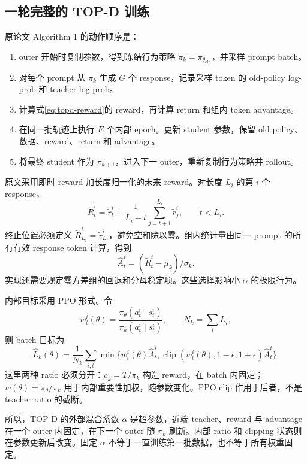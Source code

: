 \subsection{一轮完整的 TOP-D 训练}

原论文 Algorithm 1 的动作顺序是：
\begin{enumerate}
 \item outer 开始时复制参数，得到冻结行为策略 $\pi_k=\pi_{\theta_{\mathrm{old}}}$，并采样 prompt batch。
 \item 对每个 prompt 从 $\pi_k$ 生成 $G$ 个 response，记录采样 token 的 old-policy log-prob 和 teacher log-prob。
 \item 计算式\eqref{eq:topd-reward}的 reward，再计算 return 和组内 token advantage。
 \item 在同一批轨迹上执行 $E$ 个内部 epoch。更新 student 参数，保留 old policy、数据、reward、return 和 advantage。
 \item 将最终 student 作为 $\pi_{k+1}$，进入下一 outer，重新复制行为策略并 rollout。
\end{enumerate}

原文采用即时 reward 加长度归一化的未来 reward。对长度 $L_i$ 的第 $i$ 个 response，
\begin{equation}
 \widetilde R_t^i=\widetilde r_t^i+
 \frac{1}{L_i-t}\sum_{j=t+1}^{L_i}\widetilde r_j^i,\qquad t<L_i.
 \label{eq:topd-return}
\end{equation}
终止位置必须定义 $\widetilde R_{L_i}^i=\widetilde r_{L_i}^i$，避免空和除以零。组内统计量由同一 prompt 的所有有效 response token 计算，得到
\[
 \widehat A_t^i=(\widetilde R_t^i-\mu_k)/\sigma_k.
\]
实现还需要规定零方差组的回退和分母稳定项。这些选择影响小 $\alpha$ 的极限行为。

内部目标采用 PPO 形式。令
\[
 w_t^i(\theta)=\frac{\pi_\theta(a_t^i\mid s_t^i)}{\pi_k(a_t^i\mid s_t^i)},
 \qquad N_k=\sum_iL_i,
\]
则 batch 目标为
\begin{equation}
 \widehat L_k(\theta)=\frac1{N_k}\sum_{i,t}
 \min\{w_t^i(\theta)\widehat A_t^i,
 \operatorname{clip}(w_t^i(\theta),1-\epsilon,1+\epsilon)\widehat A_t^i\}.
 \label{eq:topd-ppo}
\end{equation}
这里两种 ratio 必须分开：$\rho_k=T/\pi_k$ 构造 reward，在 batch 内固定；$w(\theta)=\pi_\theta/\pi_k$ 用于内部重要性加权，随参数变化。PPO clip 作用于后者，不是 teacher ratio 的截断。

所以，TOP-D 的外部混合系数 $\alpha$ 是超参数，近端 teacher、reward 与 advantage 在一个 outer 内固定，在下一个 outer 随 $\pi_k$ 刷新。内部 ratio 和 clipping 状态则在参数更新后改变。固定 $\alpha$ 不等于一直训练第一批数据，也不等于所有权重固定。

